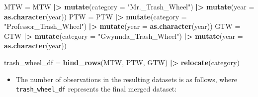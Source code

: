 \documentclass[
]{article}
\newenvironment{Shaded}{\begin{snugshade}}{\end{snugshade}}
\newcommand{\AttributeTok}[1]{\textcolor[rgb]{0.13,0.29,0.53}{#1}}
\newcommand{\FunctionTok}[1]{\textcolor[rgb]{0.13,0.29,0.53}{\textbf{#1}}}
\newcommand{\NormalTok}[1]{#1}
\newcommand{\OtherTok}[1]{\textcolor[rgb]{0.56,0.35,0.01}{#1}}
\newcommand{\SpecialCharTok}[1]{\textcolor[rgb]{0.81,0.36,0.00}{\textbf{#1}}}
\newcommand{\StringTok}[1]{\textcolor[rgb]{0.31,0.60,0.02}{#1}}
\providecommand{\tightlist}{%
  \setlength{\itemsep}{0pt}\setlength{\parskip}{0pt}}
\begin{document}
\begin{Shaded}
\begin{Highlighting}[]
\NormalTok{MTW }\OtherTok{=}\NormalTok{ MTW }\SpecialCharTok{|\textgreater{}}
  \FunctionTok{mutate}\NormalTok{(}\AttributeTok{category =} \StringTok{"Mr.\_Trash\_Wheel"}\NormalTok{) }\SpecialCharTok{|\textgreater{}}
  \FunctionTok{mutate}\NormalTok{(}\AttributeTok{year =} \FunctionTok{as.character}\NormalTok{(year))}
\NormalTok{PTW }\OtherTok{=}\NormalTok{ PTW }\SpecialCharTok{|\textgreater{}}
  \FunctionTok{mutate}\NormalTok{(}\AttributeTok{category =} \StringTok{"Professor\_Trash\_Wheel"}\NormalTok{) }\SpecialCharTok{|\textgreater{}}
  \FunctionTok{mutate}\NormalTok{(}\AttributeTok{year =} \FunctionTok{as.character}\NormalTok{(year))}
\NormalTok{GTW }\OtherTok{=}\NormalTok{ GTW }\SpecialCharTok{|\textgreater{}}
  \FunctionTok{mutate}\NormalTok{(}\AttributeTok{category =} \StringTok{"Gwynnda\_Trash\_Wheel"}\NormalTok{) }\SpecialCharTok{|\textgreater{}}
  \FunctionTok{mutate}\NormalTok{(}\AttributeTok{year =} \FunctionTok{as.character}\NormalTok{(year))}

\NormalTok{trash\_wheel\_df }\OtherTok{=} 
  \FunctionTok{bind\_rows}\NormalTok{(MTW, PTW, GTW) }\SpecialCharTok{|\textgreater{}}
  \FunctionTok{relocate}\NormalTok{(category) }
\end{Highlighting}
\end{Shaded}

\begin{itemize}
\tightlist
\item
  The number of observations in the resulting datasets is as follows,
  where \texttt{trash\_wheel\_df} represents the final merged dataset:
\end{itemize}
\end{document}
